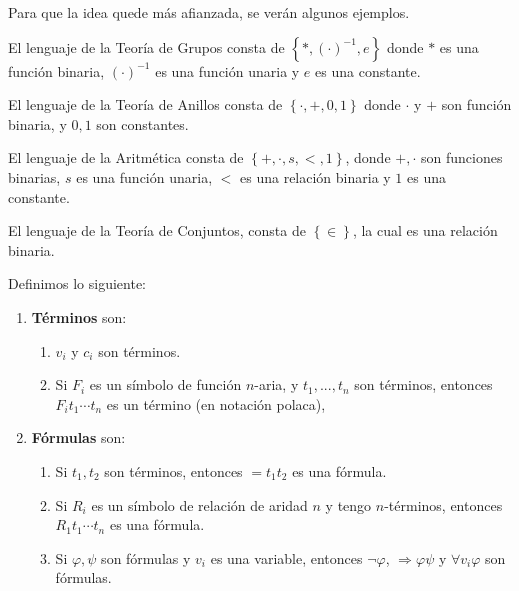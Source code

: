 \documentclass[12pt]{report}
\newcounter{it}
\theoremstyle{largebreak}
\begin{document}
    Para que la idea quede más afianzada, se verán algunos ejemplos.

    \begin{exa}
        El lenguaje de la Teoría de Grupos consta de $\left\{*,(\cdot)^{-1}, e\right\}$ donde $*$ es una función binaria, $(\cdot)^{-1}$ es una función unaria y $e$ es una constante.
    \end{exa}

    \begin{exa}
        El lenguaje de la Teoría de Anillos consta de $\left\{\cdot,+,0,1 \right\}$ donde $\cdot$ y $+$ son función binaria, y $0,1$ son constantes.
    \end{exa}

    \begin{exa}
        El lenguaje de la Aritmética consta de $\left\{+,\cdot,s,<,1 \right\}$, donde $+,\cdot$ son funciones binarias, $s$ es una función unaria, $<$ es una relación binaria y $1$ es una constante.
    \end{exa}

    \begin{exa}
        El lenguaje de la Teoría de Conjuntos, consta de $\left\{\in \right\}$, la cual es una relación binaria.
    \end{exa}

    \begin{mydef}
        Definimos lo siguiente:
        \begin{enumerate}
            \item \textbf{Términos} son:
            \begin{enumerate}
                \item $v_i$ y $c_i$ son términos.
                \item Si $F_i$ es un símbolo de función $n$-aria, y $t_1,...,t_n$ son términos, entonces $F_i t_1\cdots t_n$ es un término (en notación polaca),
            \end{enumerate}
            \item \textbf{Fórmulas} son:
            \begin{enumerate}
                \item Si $t_1,t_2$ son términos, entonces $=t_1t_2$ es una fórmula.
                \item Si $R_i$ es un símbolo de relación de aridad $n$ y tengo $n$-términos, entonces $R_1t_1\cdots t_n$ es una fórmula.
                \item Si $\varphi,\psi$ son fórmulas y $v_i$ es una variable, entonces $\neg\varphi$, $\Rightarrow\varphi\psi$ y $\forall v_i\varphi$ son fórmulas.
            \end{enumerate}
        \end{enumerate}
    \end{mydef}
\end{document}
